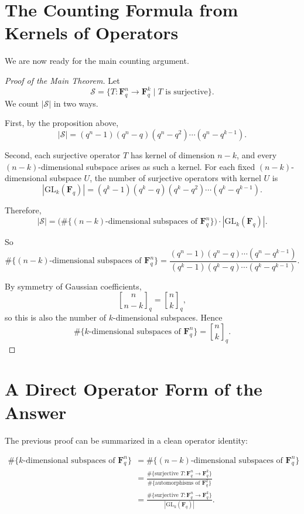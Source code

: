 \documentclass[11pt]{article}
\theoremstyle{definition}
\theoremstyle{remark}
\newcommand{\F}{\mathbf{F}}
\newcommand{\GL}{\mathrm{GL}}
\newcommand{\qbinom}[2]{\genfrac{[}{]}{0pt}{}{#1}{#2}_q}
\begin{document}
	\section{The Counting Formula from Kernels of Operators}
	
	We are now ready for the main counting argument.
	
	\begin{proof}[Proof of the Main Theorem]
		Let
		\[
		\mathcal{S}=\{T:\F_q^n\to \F_q^k \mid T \text{ is surjective}\}.
		\]
		We count \(|\mathcal{S}|\) in two ways.
		
		First, by the proposition above,
		\[
		|\mathcal{S}|=(q^n-1)(q^n-q)(q^n-q^2)\cdots(q^n-q^{k-1}).
		\]
		
		Second, each surjective operator \(T\) has kernel of dimension \(n-k\), and every \((n-k)\)-dimensional subspace arises as such a kernel. For each fixed \((n-k)\)-dimensional subspace \(U\), the number of surjective operators with kernel \(U\) is
		\[
		|\GL_k(\F_q)|
		=
		(q^k-1)(q^k-q)(q^k-q^2)\cdots(q^k-q^{k-1}).
		\]
		
		Therefore,
		\[
		|\mathcal{S}|
		=
		\bigl(\#\{\text{\((n-k)\)-dimensional subspaces of }\F_q^n\}\bigr)\cdot |\GL_k(\F_q)|.
		\]
		
		So
		\[
		\#\{\text{\((n-k)\)-dimensional subspaces of }\F_q^n\}
		=
		\frac{(q^n-1)(q^n-q)\cdots(q^n-q^{k-1})}
		{(q^k-1)(q^k-q)\cdots(q^k-q^{k-1})}.
		\]
		
		By symmetry of Gaussian coefficients,
		\[
		\qbinom{n}{n-k}=\qbinom{n}{k},
		\]
		so this is also the number of \(k\)-dimensional subspaces. Hence
		\[
		\#\{\text{\(k\)-dimensional subspaces of }\F_q^n\}
		=
		\qbinom{n}{k}.
		\]
	\end{proof}
	
	\section{A Direct Operator Form of the Answer}
	
	The previous proof can be summarized in a clean operator identity:
	
	\begin{align*}
		\#\{\text{\(k\)-dimensional subspaces of }\F_q^n\}
		&=
		\#\{\text{\((n-k)\)-dimensional subspaces of }\F_q^n\} \\
		&=
		\frac{\#\{\text{surjective }T:\F_q^n\to \F_q^k\}}
		{\#\{\text{automorphisms of }\F_q^k\}} \\
		&=
		\frac{\#\{\text{surjective }T:\F_q^n\to \F_q^k\}}
		{|\GL_k(\F_q)|}.
	\end{align*}
	
\end{document}
